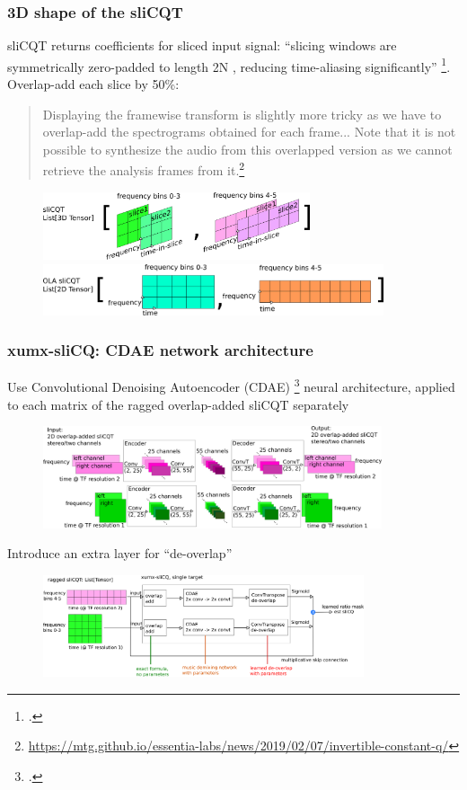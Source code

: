 \documentclass[usenames,dvipsnames]{beamer}
\begin{document}
\begin{frame}
	\frametitle{3D shape of the sliCQT}
	sliCQT returns coefficients for sliced input signal: ``slicing windows are symmetrically zero-padded to length 2N , reducing time-aliasing significantly'' \footcite[10]{slicq}. Overlap-add each slice by 50\%:
	\begin{quote}
		Displaying the framewise transform is slightly more tricky as we have to overlap-add the spectrograms obtained for each frame... Note that it is not possible to synthesize the audio from this overlapped version as we cannot retrieve the analysis frames from it.\footnote{\url{https://mtg.github.io/essentia-labs/news/2019/02/07/invertible-constant-q/}}
	\end{quote}
	\begin{figure}
		\centering
		\includegraphics[height=2cm]{./images-blockdiagrams/slicq3ddatastructure.png}\\
		\includegraphics[height=1.5cm]{./images-blockdiagrams/slicq2ddatastructure.png}
	\end{figure}
\end{frame}

\begin{frame}
	\frametitle{xumx-sliCQ: CDAE network architecture}
	Use Convolutional Denoising Autoencoder (CDAE) \footcite{plumbley1, plumbley2} neural architecture, applied to each matrix of the ragged overlap-added sliCQT separately
	\begin{figure}
		\vspace{-0.25em}
		\centering
		\includegraphics[height=3cm]{./images-blockdiagrams/xumx_slicq_cdae.png}
		\vspace{-0.25em}
	\end{figure}
	Introduce an extra layer for ``de-overlap''
	\begin{figure}
		\vspace{-0.25em}
		\centering
		\includegraphics[height=3cm]{./images-blockdiagrams/xumx_slicq_pertarget_largefont.png}
		\vspace{-0.25em}
	\end{figure}
\end{frame}
\end{document}
